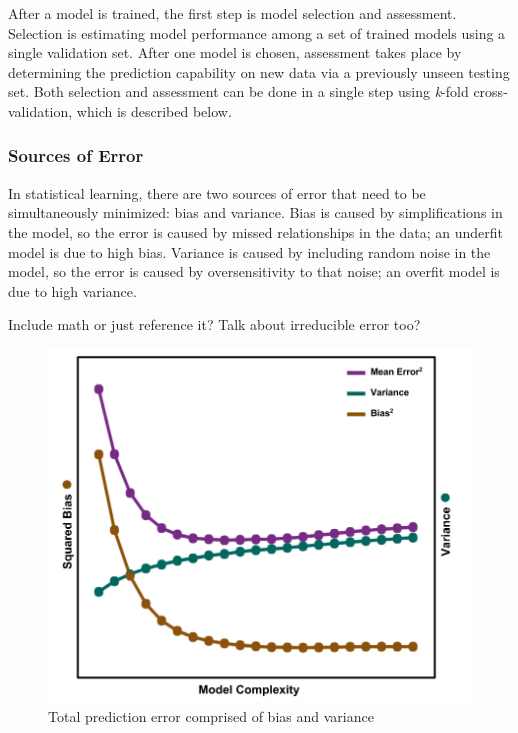 After a model is trained, the first step is model selection and assessment.
Selection is estimating model performance among a set of trained models using a
single validation set.  After one model is chosen, assessment takes place by
determining the prediction capability on new data via a previously unseen
testing set. Both selection and assessment can be done in a single step using
\textit{k}-fold cross-validation, which is described below.

\subsubsection{Sources of Error} 

In statistical learning, there are two sources of error that need to be
simultaneously minimized: bias and variance. Bias is caused by simplifications
in the model, so the error is caused by missed relationships in the data; an
underfit model is due to high bias.  Variance is caused by including random
noise in the model, so the error is caused by oversensitivity to that noise; an
overfit model is due to high variance. 

Include math or just reference it?
Talk about irreducible error too?

\begin{figure}[!htb]
  \includegraphics[width=\linewidth]{./chapters/litrev/BVtradeoff.png}
  \caption{Total prediction error comprised of bias and variance}
  \label{fig:bvtradeoff}
\end{figure}


